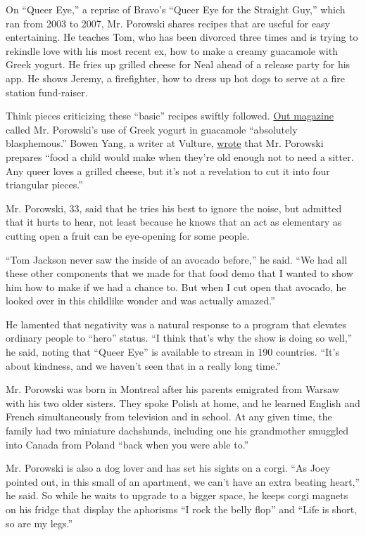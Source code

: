 On ``Queer Eye,'' a reprise of Bravo's ``Queer Eye for the Straight
Guy,'' which ran from 2003 to 2007, Mr. Porowski shares recipes that are
useful for easy entertaining. He teaches Tom, who has been divorced
three times and is trying to rekindle love with his most recent ex, how
to make a creamy guacamole with Greek yogurt. He fries up grilled cheese
for Neal ahead of a release party for his app. He shows Jeremy, a
firefighter, how to dress up hot dogs to serve at a fire station
fund-raiser.

Think pieces criticizing these ``basic'' recipes swiftly followed.
\href{https://www.out.com/television/2018/2/26/every-episode-queer-eye-reboot-ranked-worst-best?pg=full}{Out
magazine} called Mr. Porowski's use of Greek yogurt in guacamole
``absolutely blasphemous.'' Bowen Yang, a writer at Vulture,
\href{http://www.vulture.com/2018/02/queer-eye-antoni-debate.html}{wrote}
that Mr. Porowski prepares ``food a child would make when they're old
enough not to need a sitter. Any queer loves a grilled cheese, but it's
not a revelation to cut it into four triangular pieces.''

Mr. Porowski, 33, said that he tries his best to ignore the noise, but
admitted that it hurts to hear, not least because he knows that an act
as elementary as cutting open a fruit can be eye-opening for some
people.

``Tom Jackson never saw the inside of an avocado before,'' he said. ``We
had all these other components that we made for that food demo that I
wanted to show him how to make if we had a chance to. But when I cut
open that avocado, he looked over in this childlike wonder and was
actually amazed.''

He lamented that negativity was a natural response to a program that
elevates ordinary people to ``hero'' status. ``I think that's why the
show is doing so well,'' he said, noting that ``Queer Eye'' is available
to stream in 190 countries. ``It's about kindness, and we haven't seen
that in a really long time.''

Mr. Porowski was born in Montreal after his parents emigrated from
Warsaw with his two older sisters. They spoke Polish at home, and he
learned English and French simultaneously from television and in school.
At any given time, the family had two miniature dachshunds, including
one his grandmother smuggled into Canada from Poland ``back when you
were able to.''

Mr. Porowski is also a dog lover and has set his sights on a corgi. ``As
Joey pointed out, in this small of an apartment, we can't have an extra
beating heart,'' he said. So while he waits to upgrade to a bigger
space, he keeps corgi magnets on his fridge that display the aphorisms
``I rock the belly flop'' and ``Life is short, so are my legs.''


